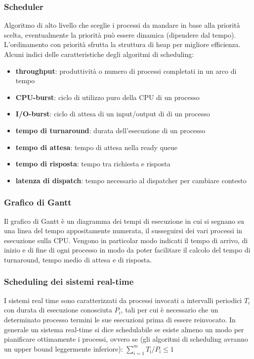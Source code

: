 \documentclass[a4paper]{article}
\begin{document}
\subsubsection*{Scheduler}
Algoritmo di alto livello che sceglie i processi da mandare in base alla priorità scelta, eventualmente la priorità può essere
dinamica (dipendere dal tempo). L'ordinamento con priorità sfrutta la struttura di heap per migliore efficienza. Alcuni indici
delle caratteristiche degli algoritmi di scheduling:
\begin{itemize}
	\item \textbf{throughput}: produttività o numero di processi completati in un arco di tempo
	\item \textbf{CPU-burst}: ciclo di utilizzo puro della CPU di un processo
	\item \textbf{I/O-burst}: ciclo di attesa di un input/output di di un processo
	\item \textbf{tempo di turnaround}: durata dell'esecuzione di un processo
	\item \textbf{tempo di attesa}: tempo di attesa nella ready queue
	\item \textbf{tempo di risposta}: tempo tra richiesta e risposta
	\item \textbf{latenza di dispatch}: tempo necessario al dispatcher per cambiare contesto
\end{itemize}

\subsubsection*{Grafico di Gantt}
Il grafico di Gantt è un diagramma dei tempi di esecuzione in cui si segnano su una linea del tempo appositamente numerata, il
susseguirsi dei vari processi in esecuzione sulla CPU. Vengono in particolar modo indicati il tempo di arrivo, di inizio e di
fine di ogni processo in modo da poter facilitare il calcolo del tempo di turnaround, tempo medio di attesa e di risposta.

\subsubsection*{Scheduling dei sistemi real-time}
I sistemi real time sono caratterizzati da processi invocati a intervalli periodici \(T_i\) con durata di esecuzione conosciuta
\(P_i\), tali per cui è necessario che un determinato processo termini le sue esecuzioni prima di essere reinvocato. In generale
un sistema real-time si dice schedulabile se esiste almeno un modo per pianificare ottimamente i processi, ovvero se (gli
algoritmi di scheduling avranno un upper bound leggermente inferiore):
\(\sum_{i=1}^{m} T_\text{i} / P_\text{i} \leq 1\)
\end{document}
